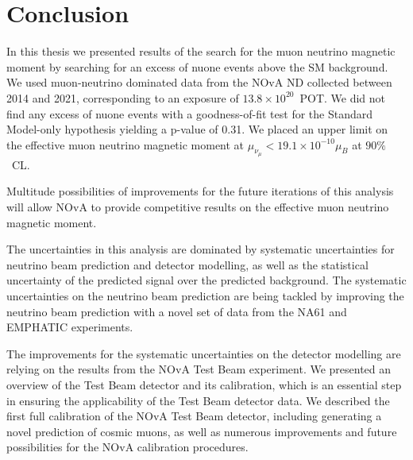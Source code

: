\chapter{Conclusion}\label{sec:Conclusion}

In this thesis we presented results of the search for the muon neutrino magnetic moment by searching for an excess of \gls{nuone} events above the \gls{SM} background. We used muon-neutrino dominated data from the \gls{NOvA} \gls{ND} collected between 2014 and 2021, corresponding to an exposure of $13.8\times10^{20}$~\gls{POT}. We did not find any excess of \gls{nuone} events with a goodness-of-fit test for the Standard Model-only hypothesis yielding a p-value of 0.31. We placed an upper limit on the effective muon neutrino magnetic moment at $\mu_{\nu_\mu}<19.1\times 10^{-10}\mu_B$ at $90\%$~\gls{CL}.

Multitude possibilities of improvements for the future iterations of this analysis will allow \gls{NOvA} to provide competitive results on the effective muon neutrino magnetic moment.

The uncertainties in this analysis are dominated by systematic uncertainties for neutrino beam prediction and detector modelling, as well as the statistical uncertainty of the predicted signal over the predicted background. The systematic uncertainties on the neutrino beam prediction are being tackled by improving the neutrino beam prediction with a novel set of data from the NA61 and EMPHATIC experiments.

The improvements for the systematic uncertainties on the detector modelling are relying on the results from the \gls{NOvA} Test Beam experiment. We presented an overview of the Test Beam detector and its calibration, which is an essential step in ensuring the applicability of the Test Beam detector data. We described the first full calibration of the \gls{NOvA} Test Beam detector, including generating a novel prediction of cosmic muons, as well as numerous improvements and future possibilities for the \gls{NOvA} calibration procedures.